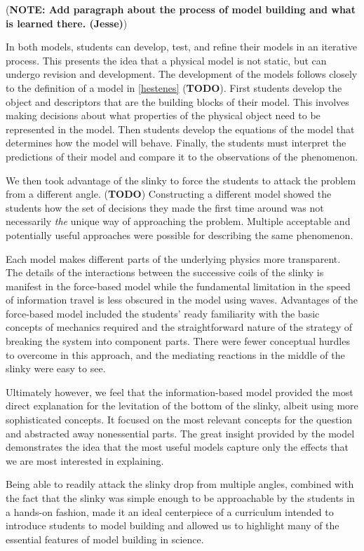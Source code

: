 \documentclass[prb,preprint,superscriptaddress]{revtex4-1}
\newcommand{\TODO}[1]{\marginpar{\raggedright\scriptsize\textbf{TODO:} #1} (\textbf{TODO})}
\newcommand{\NOTE}[1]{\marginpar{\footnotesize\textbf{NOTE}} (\textbf{NOTE: #1})}
\begin{document}
\NOTE{Add paragraph about the process of model building and what is learned there. (Jesse)}

In both models, students can develop, test, and refine their models in an iterative process.
This presents the idea that a physical model is not static, but can undergo revision and development.
The development of the models follows closely to the definition of a model in \ref{hestenes}\TODO{Put in 1987 paper here}. First students develop the object and descriptors that are the building blocks of their model.
This involves making decisions about what properties of the physical object need to be represented in the model.
Then students develop the equations of the model that determines how the model will behave.
Finally, the students must interpret the predictions of their model and compare it to the observations of the phenomenon.

We then took advantage of the slinky to force the students to attack the problem
from a different angle.\TODO{Reword this sentence} Constructing a different model showed the students
how the set of decisions they made the first time around was not necessarily
\emph{the} unique way of approaching the problem. Multiple acceptable and potentially
useful approaches were possible for describing the same phenomenon.

Each model makes different parts of the underlying physics
more transparent. The details of the interactions between the successive coils
of the slinky is manifest in the force-based model while the fundamental
limitation in the speed of information travel is less obscured in the model
using waves. Advantages of the force-based model included the students' ready
familiarity with the basic concepts of mechanics required and the straightforward
nature of the strategy of breaking the system into component parts. There were
fewer conceptual hurdles to overcome in this approach, and the mediating
reactions in the middle of the slinky were easy to see. 

Ultimately however, we feel that the information-based model provided the
most direct explanation for the levitation of the bottom of the slinky, albeit
using more sophisticated concepts. It focused
on the most relevant concepts for the question and abstracted away
nonessential parts. The great insight provided by the
model demonstrates the idea that the most useful models
capture only the effects that we are most interested in explaining.

Being able to readily attack the slinky drop from multiple angles, combined with
the fact that the slinky was simple enough to be approachable by the students
in a hands-on fashion, made it an ideal centerpiece of a curriculum intended to
introduce students to model building and allowed us to highlight many of the
essential features of model building in science.
\end{document}
